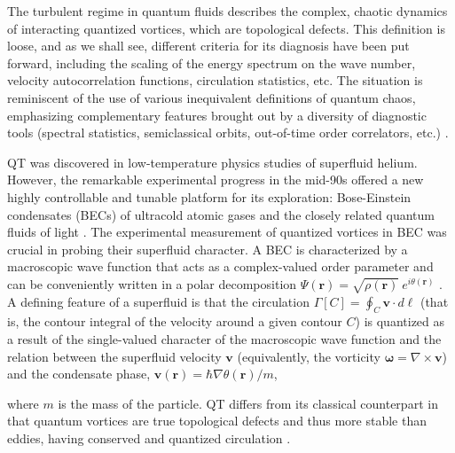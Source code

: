 \documentclass[aps,prl,twocolumn,showpacs,notitlepage,floatfix,superscriptaddress]{revtex4-1}
\begin{document}
The turbulent regime in quantum fluids describes the complex, chaotic dynamics of interacting quantized vortices, which are topological defects. This definition is loose, and as we shall see, different criteria for its diagnosis have been put forward, including the scaling of the energy spectrum on the wave number, velocity autocorrelation functions, circulation statistics, etc. The situation is reminiscent of the use of various inequivalent definitions of quantum chaos, emphasizing complementary features brought out by a diversity of diagnostic tools (spectral statistics, semiclassical orbits, out-of-time order correlators, etc.) \cite{Nandy25}. 

QT was discovered in low-temperature physics studies of superfluid helium. However, the remarkable experimental progress in the mid-90s offered a new highly controllable and tunable platform for its exploration: Bose-Einstein condensates (BECs) of ultracold atomic gases \cite{Ueda10} and the closely related quantum fluids of light \cite{Carusotto13}. The experimental measurement of quantized vortices in BEC was crucial in probing their superfluid character. 
A BEC is characterized
by a macroscopic wave function that acts as a complex-valued order parameter 
and can be conveniently written in a polar decomposition $\Psi(\boldsymbol{r})=\sqrt{
\rho \left( \boldsymbol{r} \right) 
}\ e^{i\theta(\boldsymbol{r})}$ \cite{pitaevskii2003bose}. A defining feature of a superfluid is that the circulation $\Gamma[C]=\oint_C \boldsymbol{v}\cdot d\boldsymbol{\ell}$ (that is, the contour integral of the velocity around a given contour $C$) is quantized as a result of the single-valued character of the macroscopic wave function and the relation between the superfluid velocity $\boldsymbol{v}$ (equivalently, the vorticity $\boldsymbol{\omega}=\nabla\times\boldsymbol{v}$) and the condensate phase, $\boldsymbol{v}(\boldsymbol{r})=\hbar\nabla\theta(\boldsymbol{r})/m$, 
 
where $m$ is the mass of the particle.
QT differs from its classical counterpart in that quantum vortices are true topological defects and thus more stable than eddies, having conserved and quantized circulation \cite{Tsubota13,Tsatsos16}.
\end{document}
